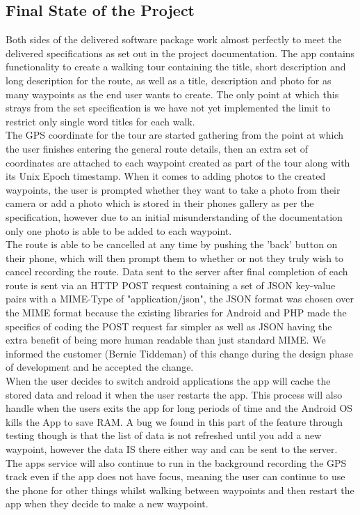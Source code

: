 \documentclass{article}
\begin{document}
		\newpage
		\subsection{Final State of the Project}
		Both sides of the delivered software package work almost perfectly to meet the delivered specifications as set out in the project documentation. 
		The app contains functionality to create a walking tour containing the title, short description and long description for the route, as well as a title, description and photo for as many waypoints as the end user wants to create. The only point at which this strays from the set specification is we have not yet implemented the limit to restrict only single word titles for each walk. \\
		
		The GPS coordinate for the tour are started gathering from the point at which the user finishes entering the general route details, then an extra set of coordinates are attached to each waypoint created as part of the tour along with its Unix Epoch timestamp. When it comes to adding photos to the created waypoints, the user is prompted whether they want to take a photo from their camera or add a photo which is stored in their phones gallery as per the specification, however due to an initial misunderstanding of the documentation only one photo is able to be added to each waypoint. \\
		
		The route is able to be cancelled at any time by pushing the 'back' button on their phone, which will then prompt them to whether or not they truly wish to cancel recording the route. Data sent to the server after final completion of each route is sent via an HTTP POST request containing a set of JSON key-value pairs with a MIME-Type of "application/json", the JSON format was chosen over the MIME format because the existing libraries for Android and PHP made the specifics of coding the POST request far simpler as well as JSON having the extra benefit of being more human readable than just standard MIME. We informed the customer (Bernie Tiddeman) of this change during the design phase of development and he accepted the change. \\
		
		When the user decides to switch android applications the app will cache the stored data and reload it when the user restarts the app. This process will also handle when the users exits the app for long periods of time and the Android OS kills the App to save RAM. A bug we found in this part of the feature through testing though is that the list of data is not refreshed until you add a new waypoint, however the data IS there either way and can be sent to the server. The apps service will also continue to run in the background recording the GPS track even if the app does not have focus, meaning the user can continue to use the phone for other things whilst walking between waypoints and then restart the app when they decide to make a new waypoint. \\
		
\end{document}
